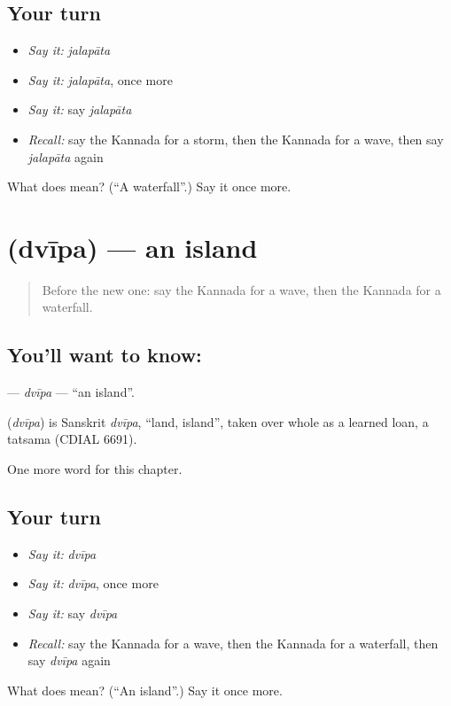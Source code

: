\subsection*{Your turn}
\begin{itemize}
\raggedright
  \item \emph{Say it:} \emph{jalapāta}
  \item \emph{Say it:} \emph{jalapāta}, once more
  \item \emph{Say it:} say \emph{jalapāta}
  \item \emph{Recall:} say the Kannada for a storm, then the Kannada for a wave, then say \emph{jalapāta} again
\end{itemize}

\begin{tcolorbox}[breakable,colback=teal!4,colframe=teal!35!black,title={Before you move on}]
What does  mean? (\textquotedblleft{}A waterfall\textquotedblright{}.) Say it once more.
\end{tcolorbox}
\section[\texorpdfstring{\kn{ದ್ವೀಪ} (dvīpa)}{ದ್ವೀಪ (dvīpa)}]{ (dvīpa) — an island}

\label{lesson:KA-C128-dvipa}



\begin{quote}
Before the new one: say the Kannada for a wave, then the Kannada for a waterfall.
\end{quote}

\subsection*{You'll want to know: }
\textbf{} — \emph{dvīpa} — \textquotedblleft{}an island\textquotedblright{}.

\begin{cousinweb}
\textbf{} (\emph{dvīpa}) is Sanskrit \emph{dvīpa}, \textquotedblleft{}land, island\textquotedblright{}, taken over whole as a learned loan, a tatsama (CDIAL 6691).
\end{cousinweb}

\begin{grammarlens}[title={What you've built}]
One more word for this chapter.
\end{grammarlens}

\subsection*{Your turn}
\begin{itemize}
\raggedright
  \item \emph{Say it:} \emph{dvīpa}
  \item \emph{Say it:} \emph{dvīpa}, once more
  \item \emph{Say it:} say \emph{dvīpa}
  \item \emph{Recall:} say the Kannada for a wave, then the Kannada for a waterfall, then say \emph{dvīpa} again
\end{itemize}

\begin{tcolorbox}[breakable,colback=teal!4,colframe=teal!35!black,title={Before you move on}]
What does  mean? (\textquotedblleft{}An island\textquotedblright{}.) Say it once more.
\end{tcolorbox}
